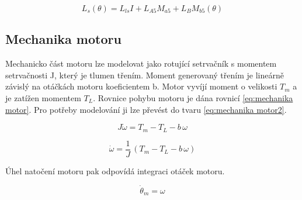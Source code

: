 \begin{equation}
    \label{eq:model abc induknost}
    L_{s}(\theta) = L_{ls}I + L_{A5}M_{a5} + L_{B}M_{b5}(\theta)
\end{equation}




\subsection{Mechanika motoru}
\label{kap:mechanika}
Mechanicko část motoru lze modelovat jako rotující setrvačník s momentem setrvačnosti J, který je tlumen třením. Moment generovaný třením je lineárně závislý na otáčkách motoru koeficientem b. Motor vyvíjí moment o velikosti $T_m$ a je zatížen momentem $T_L$. Rovnice pohybu motoru je dána rovnicí \ref{eq:mechanika motor}. Pro potřeby modelování ji lze převést do tvaru \ref{eq:mechanika motor2}.

\begin{equation}
    \label{eq:mechanika motor}
J\dot{\omega} = T_m - T_L - b\,\omega
\end{equation}

\begin{equation}
        \label{eq:mechanika motor2}
\dot{\omega} = \frac{1}{J} \,(T_m - T_L - b\,\omega)
\end{equation}

Úhel natočení motoru pak odpovídá integraci otáček motoru.

\begin{equation}
    \dot{\theta}_m = \omega
\end{equation}

%





